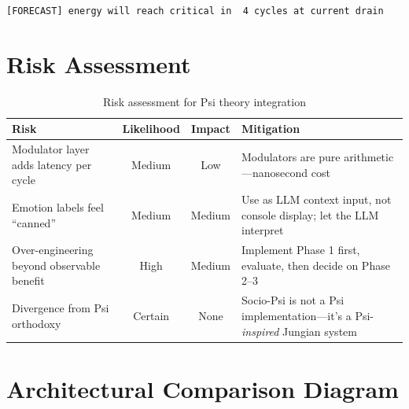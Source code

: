 \documentclass[11pt,letterpaper]{article}
\begin{document}
\texttt{[FORECAST] energy will reach critical in ~4 cycles at current drain}

\section{Risk Assessment}

\begin{table}[H]
\centering
\small\sffamily
\caption{Risk assessment for Psi theory integration}
\label{tab:risks}
\begin{tabularx}{\textwidth}{X c c X}
\toprule
\textbf{Risk} & \textbf{Likelihood} & \textbf{Impact} & \textbf{Mitigation} \\
\midrule
Modulator layer adds latency per cycle &
  Medium & Low &
  Modulators are pure arithmetic---nanosecond cost \\
Emotion labels feel ``canned'' &
  Medium & Medium &
  Use as LLM context input, not console display; let the LLM interpret \\
Over-engineering beyond observable benefit &
  High & Medium &
  Implement Phase 1 first, evaluate, then decide on Phase 2--3 \\
Divergence from Psi orthodoxy &
  Certain & None &
  Socio-Psi is not a Psi implementation---it's a Psi-\emph{inspired}
  Jungian system \\
\bottomrule
\end{tabularx}
\end{table}

\section{Architectural Comparison Diagram}
\end{document}
